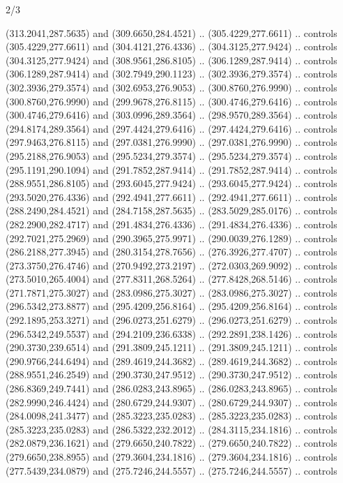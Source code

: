 \begin{flagdescription}{2/3}
\begin{scope}[xshift=0.5\flaglength,yshift=0.5\flagwidth,scale=\flagwidth/318.91]
\begin{scope}[y=0.8pt, x=0.8pt, yscale=-1,shift={(-298.97,-199.32)}]
  (313.2041,287.5635) and (309.6650,284.4521) .. (305.4229,277.6611) .. controls
  (305.4229,277.6611) and (304.4121,276.4336) .. (304.3125,277.9424) .. controls
  (304.3125,277.9424) and (308.9561,286.8105) .. (306.1289,287.9414) .. controls
  (306.1289,287.9414) and (302.7949,290.1123) .. (302.3936,279.3574) .. controls
  (302.3936,279.3574) and (302.6953,276.9053) .. (300.8760,276.9990) .. controls
  (300.8760,276.9990) and (299.9678,276.8115) .. (300.4746,279.6416) .. controls
  (300.4746,279.6416) and (303.0996,289.3564) .. (298.9570,289.3564) .. controls
  (294.8174,289.3564) and (297.4424,279.6416) .. (297.4424,279.6416) .. controls
  (297.9463,276.8115) and (297.0381,276.9990) .. (297.0381,276.9990) .. controls
  (295.2188,276.9053) and (295.5234,279.3574) .. (295.5234,279.3574) .. controls
  (295.1191,290.1094) and (291.7852,287.9414) .. (291.7852,287.9414) .. controls
  (288.9551,286.8105) and (293.6045,277.9424) .. (293.6045,277.9424) .. controls
  (293.5020,276.4336) and (292.4941,277.6611) .. (292.4941,277.6611) .. controls
  (288.2490,284.4521) and (284.7158,287.5635) .. (283.5029,285.0176) .. controls
  (282.2900,282.4717) and (291.4834,276.4336) .. (291.4834,276.4336) .. controls
  (292.7021,275.2969) and (290.3965,275.9971) .. (290.0039,276.1289) .. controls
  (286.2188,277.3945) and (280.3154,278.7656) .. (276.3926,277.4707) .. controls
  (273.3750,276.4746) and (270.9492,273.2197) .. (272.0303,269.9092) .. controls
  (273.5010,265.4004) and (277.8311,268.5264) .. (277.8428,268.5146) .. controls
  (271.7871,275.3027) and (283.0986,275.3027) .. (283.0986,275.3027) .. controls
  (296.5342,273.8877) and (295.4209,256.8164) .. (295.4209,256.8164) .. controls
  (292.1895,253.3271) and (296.0273,251.6279) .. (296.0273,251.6279) .. controls
  (296.5342,249.5537) and (294.2109,236.6338) .. (292.2891,238.1426) .. controls
  (290.3730,239.6514) and (291.3809,245.1211) .. (291.3809,245.1211) .. controls
  (290.9766,244.6494) and (289.4619,244.3682) .. (289.4619,244.3682) .. controls
  (288.9551,246.2549) and (290.3730,247.9512) .. (290.3730,247.9512) .. controls
  (286.8369,249.7441) and (286.0283,243.8965) .. (286.0283,243.8965) .. controls
  (282.9990,246.4424) and (280.6729,244.9307) .. (280.6729,244.9307) .. controls
  (284.0098,241.3477) and (285.3223,235.0283) .. (285.3223,235.0283) .. controls
  (285.3223,235.0283) and (286.5322,232.2012) .. (284.3115,234.1816) .. controls
  (282.0879,236.1621) and (279.6650,240.7822) .. (279.6650,240.7822) .. controls
  (279.6650,238.8955) and (279.3604,234.1816) .. (279.3604,234.1816) .. controls
  (277.5439,234.0879) and (275.7246,244.5557) .. (275.7246,244.5557) .. controls

\end{scope}
\end{scope}
\end{flagdescription}
